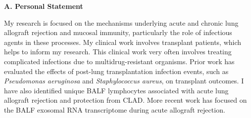 \documentclass[11pt]{nih-blank}%
\numberwithin{equation}{subsection}
\numberwithin{figure}{subsection}
\numberwithin{table}{subsection}
\begin{document}
\vspace{-0.35cm}

\medskip
\noindent\textbf{A. Personal Statement}
\smallskip

My research is focused on the mechanisms underlying acute and chronic lung allograft rejection and mucosal immunity, particularly the role of infectious agents in these processes. 
My clinical work involves transplant patients, which helps to inform my research. 
This clinical work very often involves treating complicated infections due to multidrug-resistant organisms.
Prior work has evaluated the effects of post-lung transplantation infection events, such as \textit{Pseudomonas aeruginosa} and \textit{Staphylococcus aureus}, on transplant outcomes.
I have also identified unique BALF lymphocytes associated with acute lung allograft rejection and protection from CLAD. 
More recent work has focused on the BALF exosomal {\smaller RNA} transcriptome during acute allograft rejection. 

\end{document}
